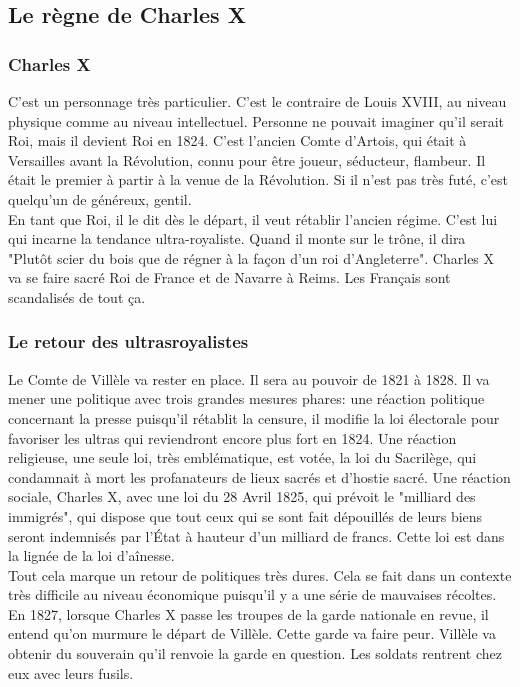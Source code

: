 \documentclass[10pt, a4paper, openany]{book}
\begin{document}
\subsection{Le règne de Charles X}

\subsubsection{Charles X}

C'est un personnage très particulier. C'est le contraire de Louis XVIII, au niveau physique comme au niveau intellectuel. Personne ne pouvait imaginer qu'il serait Roi, mais il devient Roi en 1824. C'est l'ancien Comte d'Artois, qui était à Versailles avant la Révolution, connu pour être joueur, séducteur, flambeur. Il était le premier à partir à la venue de la Révolution. Si il n'est pas très futé, c'est quelqu'un de généreux, gentil. \\
En tant que Roi, il le dit dès le départ, il veut rétablir l'ancien régime. C'est lui qui incarne la tendance ultra-royaliste. Quand il monte sur le trône, il dira "Plutôt scier du bois que de régner à la façon d'un roi d'Angleterre". Charles X va se faire sacré Roi de France et de Navarre à Reims. Les Français sont scandalisés de tout ça. 

\subsubsection{Le retour des ultrasroyalistes}

Le Comte de Villèle va rester en place. Il sera au pouvoir de 1821 à 1828. Il va mener une politique avec trois grandes mesures phares: une réaction politique concernant la presse puisqu'il rétablit la censure, il modifie la loi électorale pour favoriser les ultras qui reviendront encore plus fort en 1824. Une réaction religieuse, une seule loi, très emblématique, est votée, la loi du Sacrilège, qui condamnait à mort les profanateurs de lieux sacrés et d'hostie sacré. Une réaction sociale, Charles X, avec une loi du 28 Avril 1825, qui prévoit le "milliard des immigrés", qui dispose que tout ceux qui se sont fait dépouillés de leurs biens seront indemnisés par l'État à hauteur d'un milliard de francs. Cette loi est dans la lignée de la loi d'aînesse. \\
Tout cela marque un retour de politiques très dures. Cela se fait dans un contexte très difficile au niveau économique puisqu'il y a une série de mauvaises récoltes. En 1827, lorsque Charles X passe les troupes de la garde nationale en revue, il entend qu'on murmure le départ de Villèle. Cette garde va faire peur. Villèle va obtenir du souverain qu'il renvoie la garde en question. Les soldats rentrent chez eux avec leurs fusils. 
\end{document}
